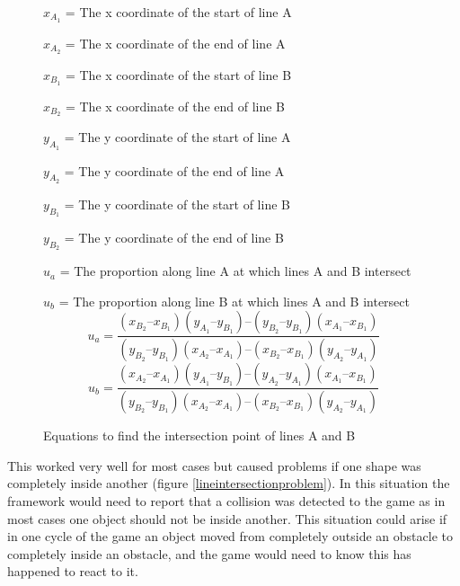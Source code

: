 \documentclass[]{report}
\begin{document}
			\begin{figure}[H]
				\centering
				$x_{A_{1}}$ = The x coordinate of the start of line A
				
				$x_{A_{2}}$ = The x coordinate of the end of line A
				
				$x_{B_{1}}$ = The x coordinate of the start of line B
				
				$x_{B_{2}}$ = The x coordinate of the end of line B
				
				$y_{A_{1}}$ = The y coordinate of the start of line A
				
				$y_{A_{2}}$ = The y coordinate of the end of line A
				
				$y_{B_{1}}$ = The y coordinate of the start of line B
				
				$y_{B_{2}}$ = The y coordinate of the end of line B
				
				$u_{a}$ = The proportion along line A at which lines A and B intersect
				
				$u_{b}$ = The proportion along line B at which lines A and B intersect
				\begin{displaymath}
				u_{a} = \frac
				{(x_{B_{2}}–x_{B_{1}})(y_{A_{1}}–y_{B_{1}})–(y_{B_{2}}–y_{B_{1}})(x_{A_{1}}–x_{B_{1}})}
				{(y_{B_{2}}–y_{B_{1}})(x_{A_{2}}–x_{A_{1}})–(x_{B_{2}}–x_{B_{1}})(y_{A_{2}}–y_{A_{1}})}
				\end{displaymath}
				\begin{displaymath}
				u_{b} = \frac
				{(x_{A_{2}}–x_{A_{1}})(y_{A_{1}}–y_{B_{1}})–(y_{A_{2}}–y_{A_{1}})(x_{A_{1}}–x_{B_{1}})}
				{(y_{B_{2}}–y_{B_{1}})(x_{A_{2}}–x_{A_{1}})–(x_{B_{2}}–x_{B_{1}})(y_{A_{2}}–y_{A_{1}})}
				\end{displaymath}
				\caption{Equations to find the intersection point of lines A and B\cite{linecollisionsite}}
				\label{lineintersectionequation}
			\end{figure}
			
			This worked very well for most cases but caused problems if one shape was completely inside another (figure \ref{lineintersectionproblem}). In this situation the framework would need to report that a collision was detected to the game as in most cases one object should not be inside another. This situation could arise if in one cycle of the game an object moved from completely outside an obstacle to completely inside an obstacle, and the game would need to know this has happened to react to it.
			
\end{document}
